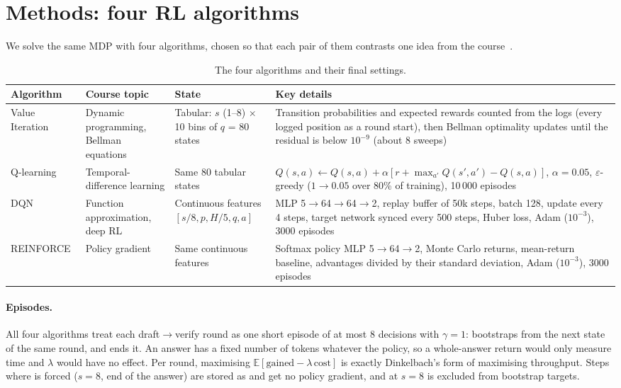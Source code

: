 \section{Methods: four RL algorithms}

We solve the same MDP with four algorithms, chosen so that each pair of them contrasts one idea from the course~\citep{sutton2018}.

\begin{table}[h]
\centering
\caption{The four algorithms and their final settings.}
\label{tab:algos}
\small
\begin{tabularx}{\linewidth}{@{}l>{\raggedright}p{2.4cm}>{\raggedright}p{2.8cm}X@{}}
\toprule
Algorithm & Course topic & State & Key details \\
\midrule
Value Iteration & Dynamic programming, Bellman equations & Tabular: $s$ (1--8) $\times$ 10 bins of $q$ = 80 states & Transition probabilities and expected rewards counted from the logs (every logged position as a round start), then Bellman optimality updates until the residual is below $10^{-9}$ (about 8 sweeps) \\
Q-learning & Temporal-difference learning & Same 80 tabular states & $Q(s,a) \leftarrow Q(s,a) + \alpha[r + \max_{a'} Q(s',a') - Q(s,a)]$, $\alpha=0.05$, $\varepsilon$-greedy ($1\to0.05$ over 80\% of training), 10\,000 episodes \\
DQN~\citep{mnih2015} & Function approximation, deep RL & Continuous features $[s/8, p, H/5, q, a]$ & MLP 5$\to$64$\to$64$\to$2, replay buffer of 50k steps, batch 128, update every 4 steps, target network synced every 500 steps, Huber loss, Adam ($10^{-3}$), 3000 episodes \\
REINFORCE~\citep{williams1992} & Policy gradient & Same continuous features & Softmax policy MLP 5$\to$64$\to$2, Monte Carlo returns, mean-return baseline, advantages divided by their standard deviation, Adam ($10^{-3}$), 3000 episodes \\
\bottomrule
\end{tabularx}
\end{table}

\paragraph{Episodes.} All four algorithms treat each draft$\to$verify round as one short episode of at most
8 decisions with $\gamma=1$: \CONT{} bootstraps from the next state of the same round, and \STOP{} ends it.
An answer has a fixed number of tokens whatever the policy, so a whole-answer return would only measure
time and $\lambda$ would have no effect. Per round, maximising
$\mathbb{E}[\text{gained}-\lambda\,\text{cost}]$ is exactly Dinkelbach's form of maximising throughput.
Steps where \STOP{} is forced ($s=8$, end of the answer) are stored as \STOP{} and get no policy gradient,
and \CONT{} at $s=8$ is excluded from bootstrap targets.

